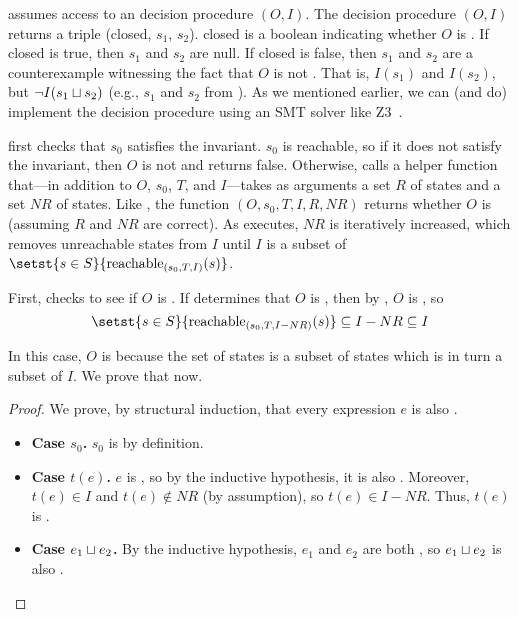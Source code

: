 {}

\IsInvConfluent{} assumes access to an \invariantclosure{} decision procedure
\IsIclosed$(O, I)$. The decision procedure \IsIclosed$(O, I)$ returns a triple
(closed, $s_1$, $s_2$).  closed is a boolean indicating whether $O$ is
\Iclosed{}. If closed is true, then $s_1$ and $s_2$ are null. If closed is
false, then $s_1$ and $s_2$ are a counterexample witnessing the fact that $O$
is not \Iclosed{}. That is, $I(s_1)$ and $I(s_2)$, but $\lnot I(s_1 \sqcup s_2)$
(e.g., $s_1$ and $s_2$ from ).  As we mentioned earlier, we can
(and do) implement the \invariantclosure{} decision procedure using an SMT
solver like Z3~\cite{de2008z3}.

\IsInvConfluent{} first checks that $s_0$ satisfies the invariant. $s_0$ is
reachable, so if it does not satisfy the invariant, then $O$ is not
\sTIconfluent{} and \IsInvConfluent{} returns false. Otherwise,
\IsInvConfluent{} calls a helper function \Helper{} that---in addition to $O$,
$s_0$, $T$, and $I$---takes as arguments a set $R$ of \sTIreachable{} states
and a set $NR$ of \sTIunreachable{} states. Like \IsInvConfluent, the function
\Helper$(O, s_0, T, I, R, NR)$ returns whether $O$ is \sTIconfluent{} (assuming
$R$ and $NR$ are correct).  As  executes,
$NR$ is iteratively increased, which removes unreachable states from $I$ until
$I$ is a subset of $\setst{s \in S}{\sTIreachablepredicate{s}}$.

First, \Helper{} checks to see if $O$ is .
%
If \IsIclosed{} determines that $O$ is , then by
, $O$ is , so
\[
  \hfill
  \setst{s \in S}{\stireachablepredicate{s_0}{T}{I-NR}{s}}
    \subseteq I - NR
    \subseteq I
  \hfill
\]

In this case, $O$ is \sTIconfluent{} because the set of \sTIreachable{} states
is a subset of  states which is in turn a subset
of $I$. We prove that now.
\begin{proof}
  We prove, by structural induction, that every \sTIreachable{} expression $e$
  is also .

  \begin{itemize}
    \item \textbf{Case $s_0$.}
      $s_0$ is  by definition.

    \item \textbf{Case $t(e)$.}
      $e$ is \sTIreachable{}, so by the inductive hypothesis, it is also
      . Moreover, $t(e) \in I$ and $t(e) \notin
      NR$ (by assumption), so $t(e) \in I - NR$. Thus, $t(e)$ is
      .

    \item \textbf{Case $e_1 \sqcup e_2$.}
      By the inductive hypothesis, $e_1$ and $e_2$ are both
      , so $e_1 \sqcup e_2$ is also
      .
  \end{itemize}
\end{proof}

